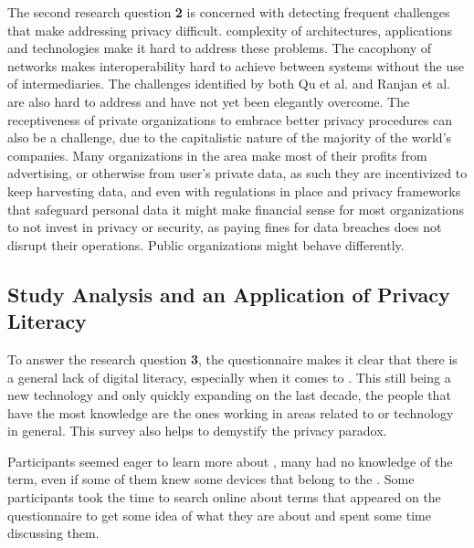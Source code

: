 The second research question \textbf{\hyperlink{\acronym}{\acronym}2} is concerned with detecting frequent
challenges that make addressing \hyperlink{\acronym}{\acronym} privacy difficult. \hyperlink{\acronym}{\acronym} complexity of architectures,
applications and technologies make it hard to address these problems. The
cacophony of networks makes interoperability hard to achieve between \hyperlink{\acronym}{\acronym} systems
without the use of intermediaries. The challenges identified by both Qu et
al. \cite{Qu2018Privacy} and Ranjan et al. \cite{perera2015big} are also hard
to address and have not yet been elegantly overcome.
The receptiveness of private organizations to embrace better privacy procedures
can also be a challenge, due to the capitalistic nature of the majority of the
world's companies. Many organizations in the \hyperlink{\acronym}{\acronym} area make most of their profits
from advertising, or otherwise from user's private data, as such they are incentivized
to keep harvesting data, and even with regulations in place and privacy frameworks
that safeguard personal data it might make financial sense for most organizations
to not invest in privacy or security, as paying fines for data breaches does not
disrupt their operations. Public organizations might behave differently.

\subsection{Study Analysis and an Application of Privacy Literacy}

To answer the research question \textbf{\hyperlink{\acronym}{\acronym}3}, the questionnaire makes it clear that there is
a general lack of digital literacy, especially when it comes to \hyperlink{\acronym}{\acronym}.
This still being a new technology and only quickly expanding
on the last decade, the people that have the most knowledge are the
ones working in areas related to \hyperlink{\acronym}{\acronym} or technology in general.
This survey also helps to demystify the privacy paradox.

Participants seemed eager to learn more about \hyperlink{\acronym}{\acronym}, many had no
knowledge of the term, even if some of them knew some devices
that belong to the \hyperlink{\acronym}{\acronym}. Some participants took the time to search
online about terms that appeared on the questionnaire to get some
idea of what they are about and spent some time discussing them.

